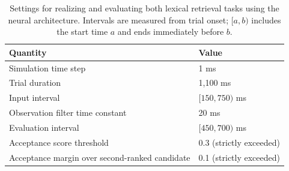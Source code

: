 \begin{table}[htbp]
\centering\small
\begin{tabular}{ll}\toprule
Quantity & Value\\\midrule
Simulation time step & 1 ms\\
Trial duration & 1,100 ms\\
Input interval & $[150,750)$ ms\\
Observation filter time constant & 20 ms\\
Evaluation interval & $[450,700)$ ms\\
Acceptance score threshold & 0.3 (strictly exceeded)\\
Acceptance margin over second-ranked candidate & 0.1 (strictly exceeded)\\\bottomrule
\end{tabular}
\caption{Settings for realizing and evaluating both lexical retrieval tasks using the neural architecture. Intervals are measured from trial onset; $[a,b)$ includes the start time $a$ and ends immediately before $b$.}\label{tab:task-settings}
\end{table}

\FloatBarrier
